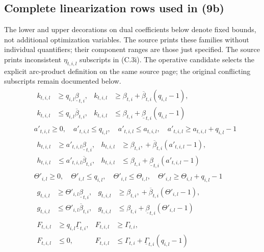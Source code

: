 \documentclass{article}
\begin{document}
\subsection*{Complete linearization rows used in (9b)}
The lower and upper decorations on dual coefficients below denote fixed bounds,
not additional optimization variables. The source prints these families without
individual quantifiers; their component ranges are those just specified. The source prints inconsistent $\eta_{t,i,l}$ subscripts in (C.3i). The operative candidate selects the explicit arc-product definition on the same source page; the original conflicting subscripts remain documented below.
\begin{align}
&\begin{aligned}
k_{t,i,l}&\geq q_{i,l}\underline\beta_{t,i},&
k_{t,i,l}&\geq\beta_{t,i}+\overline\beta_{t,i}(q_{i,l}-1),\\
k_{t,i,l}&\leq q_{i,l}\overline\beta_{t,i},&
k_{t,i,l}&\leq\beta_{t,i}+\underline\beta_{t,i}(q_{i,l}-1)
\end{aligned}\tag{C.3a}\\
& a'_{t,i,l}\geq0,\quad a'_{t,i,l}\leq q_{i,l},\quad
 a'_{t,i,l}\leq a_{t,i,l},\quad a'_{t,i,l}\geq a_{t,i,l}+q_{i,l}-1
\tag{C.3b}\\
&\begin{aligned}
h_{t,i,l}&\geq a'_{t,i,l}\underline\beta_{t,i},&
h_{t,i,l}&\geq\beta_{t,i},{}+\overline\beta_{t,i}(a'_{t,i,l}-1),\\
h_{t,i,l}&\leq a'_{t,i,l}\overline\beta_{t,i},&
h_{t,i,l}&\leq\beta_{t,i}+\underline\beta_{t,i}(a'_{t,i,l}-1)
\end{aligned}\tag{C.3c}\\
&\Theta'_{i,l}\geq0,\quad\Theta'_{i,l}\leq q_{i,l},\quad
\Theta'_{i,l}\leq\Theta_{i,l},\quad\Theta'_{i,l}\geq\Theta_{i,l}+q_{i,l}-1
\tag{C.3d}\\
&\begin{aligned}
g_{t,i,l}&\geq\Theta'_{i,l}\underline\beta_{t,i},&
g_{t,i,l}&\geq\beta_{t,i},{}+\overline\beta_{t,i}(\Theta'_{i,l}-1),\\
g_{t,i,l}&\leq\Theta'_{i,l}\overline\beta_{t,i},&
g_{t,i,l}&\leq\beta_{t,i}+\underline\beta_{t,i}(\Theta'_{i,l}-1)
\end{aligned}\tag{C.3e}\\
&\begin{aligned}
F_{t,i,l}&\geq q_{i,l}\underline\Gamma_{t,i},&F_{t,i,l}&\geq\Gamma_{t,i},\\
F_{t,i,l}&\leq0,&F_{t,i,l}&\leq\Gamma_{t,i}+\underline\Gamma_{t,i}(q_{i,l}-1)

\end{aligned}
\end{align}
\end{document}
